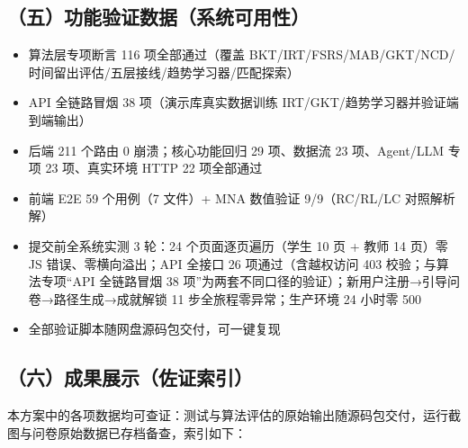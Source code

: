 \documentclass[zihao=-4,a4paper,UTF8,fontset=windows]{ctexart}
\begin{document}
\subsection{（五）功能验证数据（系统可用性）}
\begin{itemize}[leftmargin=2em,itemsep=0pt,topsep=0pt]
\item 算法层专项断言 116 项全部通过（覆盖 BKT/IRT/FSRS/MAB/GKT/NCD/时间留出评估/五层接线/趋势学习器/匹配探索）
\end{itemize}
\begin{itemize}[leftmargin=2em,itemsep=0pt,topsep=0pt]
\item API 全链路冒烟 38 项（演示库真实数据训练 IRT/GKT/趋势学习器并验证端到端输出）
\end{itemize}
\begin{itemize}[leftmargin=2em,itemsep=0pt,topsep=0pt]
\item 后端 211 个路由 0 崩溃；核心功能回归 29 项、数据流 23 项、Agent/LLM 专项 23 项、真实环境 HTTP 22 项全部通过
\end{itemize}
\begin{itemize}[leftmargin=2em,itemsep=0pt,topsep=0pt]
\item 前端 E2E 59 个用例（7 文件）+ MNA 数值验证 9/9（RC/RL/LC 对照解析解）
\end{itemize}
\begin{itemize}[leftmargin=2em,itemsep=0pt,topsep=0pt]
\item 提交前全系统实测 3 轮：24 个页面逐页遍历（学生 10 页 + 教师 14 页）零 JS 错误、零横向溢出；API 全接口 26 项通过（含越权访问 403 校验；与算法专项“API 全链路冒烟 38 项”为两套不同口径的验证）；新用户注册→引导问卷→路径生成→成就解锁 11 步全旅程零异常；生产环境 24 小时零 500
\end{itemize}
\begin{itemize}[leftmargin=2em,itemsep=0pt,topsep=0pt]
\item 全部验证脚本随网盘源码包交付，可一键复现
\end{itemize}
\subsection{（六）成果展示（佐证索引）}

本方案中的各项数据均可查证：测试与算法评估的原始输出随源码包交付，运行截图与问卷原始数据已存档备查，索引如下：
\end{document}
